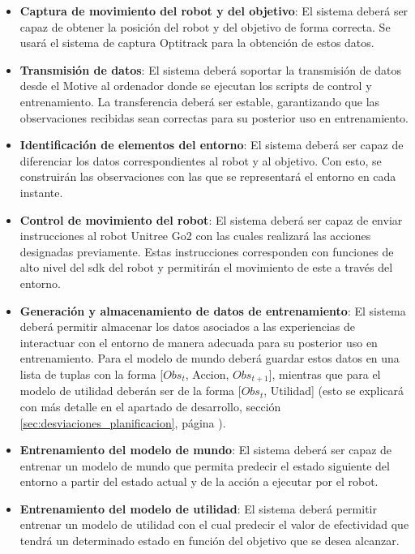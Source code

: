 \begin{itemize}
    \item \textbf{Captura de movimiento del robot y del objetivo}:
    El sistema deberá ser capaz de obtener la posición del robot y del objetivo de forma correcta. Se usará el sistema de captura Optitrack para la 
    obtención de estos datos.
 
    \item \textbf{Transmisión de datos}:
    El sistema deberá soportar la transmisión de datos desde el Motive al ordenador donde se ejecutan los scripts de control y entrenamiento. La 
    transferencia deberá ser estable, garantizando que las observaciones recibidas sean correctas para su posterior uso en entrenamiento.

    \item \textbf{Identificación de elementos del entorno}:
    El sistema deberá ser capaz de diferenciar los datos correspondientes al robot y al objetivo. Con esto, se construirán las observaciones con las 
    que se representará el entorno en cada instante.

    \item \textbf{Control de movimiento del robot}:
    El sistema deberá ser capaz de enviar instrucciones al robot Unitree Go2 con las cuales realizará las acciones designadas previamente. Estas instrucciones 
    corresponden con funciones de alto nivel del \Gls{sdk} del robot y permitirán el movimiento de este a través del entorno.

    \item \textbf{Generación y almacenamiento de datos de entrenamiento}:
    El sistema deberá permitir almacenar los datos asociados a las experiencias de interactuar con el entorno de manera adecuada para su posterior uso en 
    entrenamiento. Para el modelo de mundo deberá guardar estos datos en una lista de tuplas con la forma [\( Obs_t \), Accion, \( Obs_{t+1} \)], mientras que para el modelo de 
    utilidad deberán ser de la forma [\( Obs_t \), Utilidad] (esto se explicará con más detalle en el apartado de desarrollo, sección \ref{sec:desviaciones_planificacion}, 
    página \pageref{sec:desviaciones_planificacion}).

    \item \textbf{Entrenamiento del modelo de mundo}:
    El sistema deberá ser capaz de entrenar un modelo de mundo que permita predecir el estado siguiente del entorno a partir del estado actual y de la acción a 
    ejecutar por el robot.

    \item \textbf{Entrenamiento del modelo de utilidad}:
    El sistema deberá permitir entrenar un modelo de utilidad con el cual predecir el valor de efectividad que tendrá un determinado estado en función del objetivo 
    que se desea alcanzar.


\end{itemize}

